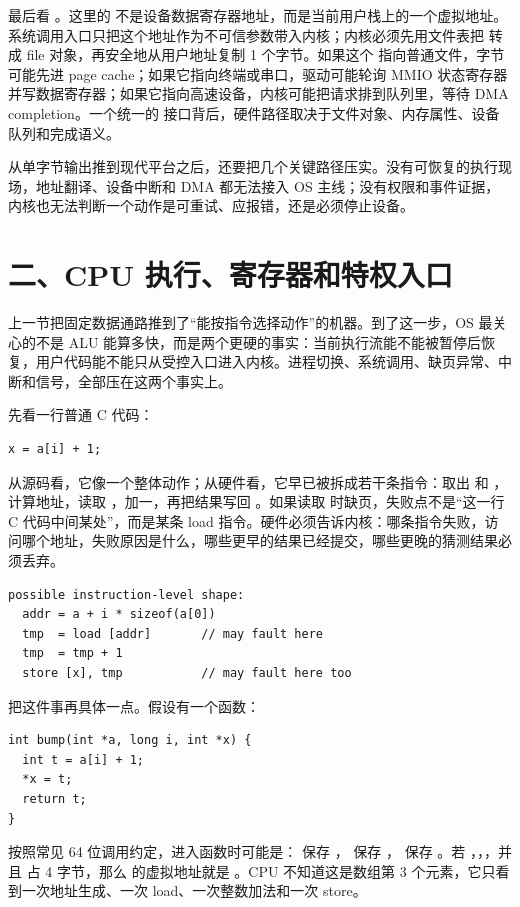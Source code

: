 最后看 。这里的  不是设备数据寄存器地址，而是当前用户栈上的一个虚拟地址。系统调用入口只把这个地址作为不可信参数带入内核；内核必须先用文件表把  转成 file 对象，再安全地从用户地址复制 1 个字节。如果这个  指向普通文件，字节可能先进 page cache；如果它指向终端或串口，驱动可能轮询 MMIO 状态寄存器并写数据寄存器；如果它指向高速设备，内核可能把请求排到队列里，等待 DMA completion。一个统一的  接口背后，硬件路径取决于文件对象、内存属性、设备队列和完成语义。

从单字节输出推到现代平台之后，还要把几个关键路径压实。没有可恢复的执行现场，地址翻译、设备中断和 DMA 都无法接入 OS 主线；没有权限和事件证据，内核也无法判断一个动作是可重试、应报错，还是必须停止设备。

\section{二、CPU 执行、寄存器和特权入口}

上一节把固定数据通路推到了“能按指令选择动作”的机器。到了这一步，OS 最关心的不是 ALU 能算多快，而是两个更硬的事实：当前执行流能不能被暂停后恢复，用户代码能不能只从受控入口进入内核。进程切换、系统调用、缺页异常、中断和信号，全部压在这两个事实上。

先看一行普通 C 代码：

\begin{lstlisting}
x = a[i] + 1;
\end{lstlisting}

从源码看，它像一个整体动作；从硬件看，它早已被拆成若干条指令：取出  和 ，计算地址，读取 ，加一，再把结果写回 。如果读取  时缺页，失败点不是“这一行 C 代码中间某处”，而是某条 load 指令。硬件必须告诉内核：哪条指令失败，访问哪个地址，失败原因是什么，哪些更早的结果已经提交，哪些更晚的猜测结果必须丢弃。

\begin{lstlisting}
possible instruction-level shape:
  addr = a + i * sizeof(a[0])
  tmp  = load [addr]       // may fault here
  tmp  = tmp + 1
  store [x], tmp           // may fault here too
\end{lstlisting}

把这件事再具体一点。假设有一个函数：

\begin{lstlisting}
int bump(int *a, long i, int *x) {
  int t = a[i] + 1;
  *x = t;
  return t;
}
\end{lstlisting}

按照常见 64 位调用约定，进入函数时可能是： 保存 ， 保存 ， 保存 。若 ，，，并且  占 4 字节，那么  的虚拟地址就是 。CPU 不知道这是数组第 3 个元素，它只看到一次地址生成、一次 load、一次整数加法和一次 store。

